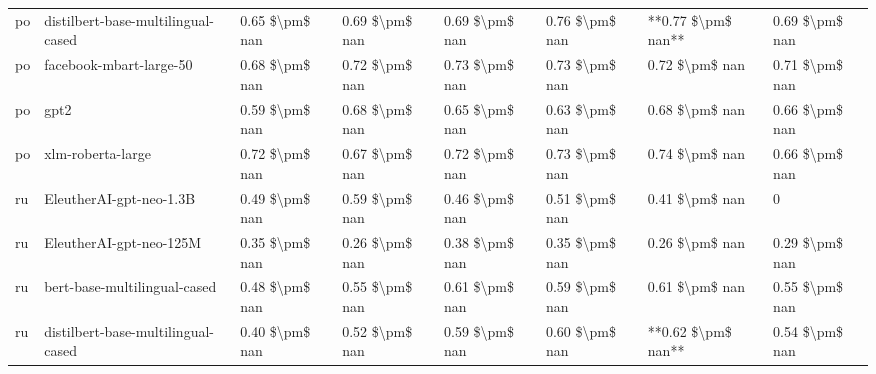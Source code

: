 \begin{tabular}{llllllll}
      po & distilbert-base-multilingual-cased & 0.65 \$\textbackslash pm\$ nan &            0.69 \$\textbackslash pm\$ nan &        0.69 \$\textbackslash pm\$ nan &         0.76 \$\textbackslash pm\$ nan &                      **0.77 \$\textbackslash pm\$ nan** &     0.69 \$\textbackslash pm\$ nan \\
      po &            facebook-mbart-large-50 & 0.68 \$\textbackslash pm\$ nan &            0.72 \$\textbackslash pm\$ nan &        0.73 \$\textbackslash pm\$ nan &         0.73 \$\textbackslash pm\$ nan &                          0.72 \$\textbackslash pm\$ nan &     0.71 \$\textbackslash pm\$ nan \\
      po &                               gpt2 & 0.59 \$\textbackslash pm\$ nan &            0.68 \$\textbackslash pm\$ nan &        0.65 \$\textbackslash pm\$ nan &         0.63 \$\textbackslash pm\$ nan &                          0.68 \$\textbackslash pm\$ nan &     0.66 \$\textbackslash pm\$ nan \\
      po &                  xlm-roberta-large & 0.72 \$\textbackslash pm\$ nan &            0.67 \$\textbackslash pm\$ nan &        0.72 \$\textbackslash pm\$ nan &         0.73 \$\textbackslash pm\$ nan &                          0.74 \$\textbackslash pm\$ nan &     0.66 \$\textbackslash pm\$ nan \\
      ru &            EleutherAI-gpt-neo-1.3B & 0.49 \$\textbackslash pm\$ nan &            0.59 \$\textbackslash pm\$ nan &        0.46 \$\textbackslash pm\$ nan &         0.51 \$\textbackslash pm\$ nan &                          0.41 \$\textbackslash pm\$ nan &                  0 \\
      ru &            EleutherAI-gpt-neo-125M & 0.35 \$\textbackslash pm\$ nan &            0.26 \$\textbackslash pm\$ nan &        0.38 \$\textbackslash pm\$ nan &         0.35 \$\textbackslash pm\$ nan &                          0.26 \$\textbackslash pm\$ nan &     0.29 \$\textbackslash pm\$ nan \\
      ru &       bert-base-multilingual-cased & 0.48 \$\textbackslash pm\$ nan &            0.55 \$\textbackslash pm\$ nan &        0.61 \$\textbackslash pm\$ nan &         0.59 \$\textbackslash pm\$ nan &                          0.61 \$\textbackslash pm\$ nan &     0.55 \$\textbackslash pm\$ nan \\
      ru & distilbert-base-multilingual-cased & 0.40 \$\textbackslash pm\$ nan &            0.52 \$\textbackslash pm\$ nan &        0.59 \$\textbackslash pm\$ nan &         0.60 \$\textbackslash pm\$ nan &                      **0.62 \$\textbackslash pm\$ nan** &     0.54 \$\textbackslash pm\$ nan \\

\end{tabular}
